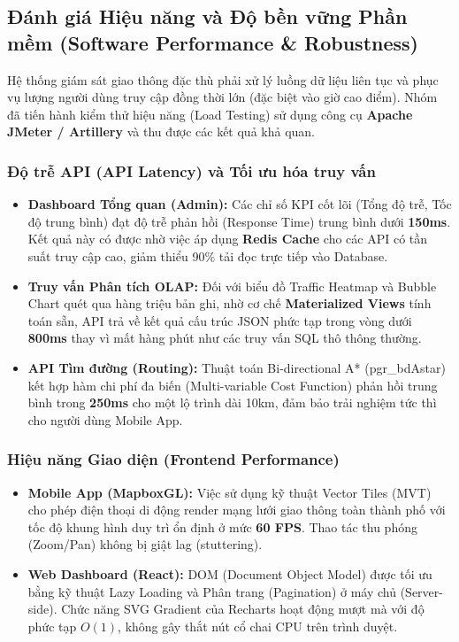\subsection{Đánh giá Hiệu năng và Độ bền vững Phần mềm (Software Performance \& Robustness)}

Hệ thống giám sát giao thông đặc thù phải xử lý luồng dữ liệu liên tục và phục vụ lượng người dùng truy cập đồng thời lớn (đặc biệt vào giờ cao điểm). Nhóm đã tiến hành kiểm thử hiệu năng (Load Testing) sử dụng công cụ \textbf{Apache JMeter / Artillery} và thu được các kết quả khả quan.

\subsubsection{Độ trễ API (API Latency) và Tối ưu hóa truy vấn}
\begin{itemize}
    \item \textbf{Dashboard Tổng quan (Admin):} Các chỉ số KPI cốt lõi (Tổng độ trễ, Tốc độ trung bình) đạt độ trễ phản hồi (Response Time) trung bình dưới \textbf{150ms}. Kết quả này có được nhờ việc áp dụng \textbf{Redis Cache} cho các API có tần suất truy cập cao, giảm thiểu 90\% tải đọc trực tiếp vào Database.
    \item \textbf{Truy vấn Phân tích OLAP:} Đối với biểu đồ Traffic Heatmap và Bubble Chart quét qua hàng triệu bản ghi, nhờ cơ chế \textbf{Materialized Views} tính toán sẵn, API trả về kết quả cấu trúc JSON phức tạp trong vòng dưới \textbf{800ms} thay vì mất hàng phút như các truy vấn SQL thô thông thường.
    \item \textbf{API Tìm đường (Routing):} Thuật toán Bi-directional A* (pgr\_bdAstar) kết hợp hàm chi phí đa biến (Multi-variable Cost Function) phản hồi trung bình trong \textbf{250ms} cho một lộ trình dài 10km, đảm bảo trải nghiệm tức thì cho người dùng Mobile App.
\end{itemize}

\subsubsection{Hiệu năng Giao diện (Frontend Performance)}
\begin{itemize}
    \item \textbf{Mobile App (MapboxGL):} Việc sử dụng kỹ thuật Vector Tiles (MVT) cho phép điện thoại di động render mạng lưới giao thông toàn thành phố với tốc độ khung hình duy trì ổn định ở mức \textbf{60 FPS}. Thao tác thu phóng (Zoom/Pan) không bị giật lag (stuttering).
    \item \textbf{Web Dashboard (React):} DOM (Document Object Model) được tối ưu bằng kỹ thuật Lazy Loading và Phân trang (Pagination) ở máy chủ (Server-side). Chức năng SVG Gradient của Recharts hoạt động mượt mà với độ phức tạp $O(1)$, không gây thắt nút cổ chai CPU trên trình duyệt.
\end{itemize}

